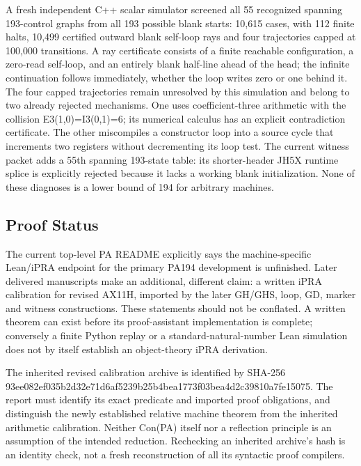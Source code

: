 A fresh independent C++ scalar simulator screened all 55 recognized spanning 193-control graphs from all 193 possible blank starts: 10,615 cases, with 112 finite halts, 10,499 certified outward blank self-loop rays and four trajectories capped at 100,000 transitions. A ray certificate consists of a finite reachable configuration, a zero-read self-loop, and an entirely blank half-line ahead of the head; the infinite continuation follows immediately, whether the loop writes zero or one behind it. The four capped trajectories remain unresolved by this simulation and belong to two already rejected mechanisms. One uses coefficient-three arithmetic with the collision E3(1,0)=I3(0,1)=6; its numerical calculus has an explicit contradiction certificate. The other miscompiles a constructor loop into a source cycle that increments two registers without decrementing its loop test. The current witness packet adds a 55th spanning 193-state table: its shorter-header JH5X runtime splice is explicitly rejected because it lacks a working blank initialization. None of these diagnoses is a lower bound of 194 for arbitrary machines.

\subsection{Proof Status}

The current top-level PA README explicitly says the machine-specific Lean/iPRA endpoint for the primary PA194 development is unfinished. Later delivered manuscripts make an additional, different claim: a written iPRA calibration for revised AX11H, imported by the later GH/GHS, loop, GD, marker and witness constructions. These statements should not be conflated. A written theorem can exist before its proof-assistant implementation is complete; conversely a finite Python replay or a standard-natural-number Lean simulation does not by itself establish an object-theory iPRA derivation.

The inherited revised calibration archive is identified by SHA-256 93ee082ef035b2d32e71d6af5239b25b4bea1773f03bea4d2c39810a7fe15075. The report must identify its exact predicate and imported proof obligations, and distinguish the newly established relative machine theorem from the inherited arithmetic calibration. Neither Con(PA) itself nor a reflection principle is an assumption of the intended reduction. Rechecking an inherited archive's hash is an identity check, not a fresh reconstruction of all its syntactic proof compilers.

